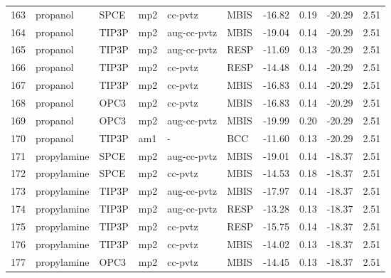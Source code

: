 \begin{tabular}{llllllrrrr}
163 &                       propanol &       SPCE &      mp2 &      cc-pvtz &         MBIS & -16.82 &      0.19 &      -20.29 &     2.51 \\
164 &                       propanol &      TIP3P &      mp2 &  aug-cc-pvtz &         MBIS & -19.04 &      0.14 &      -20.29 &     2.51 \\
165 &                       propanol &      TIP3P &      mp2 &  aug-cc-pvtz &         RESP & -11.69 &      0.13 &      -20.29 &     2.51 \\
166 &                       propanol &      TIP3P &      mp2 &      cc-pvtz &         RESP & -14.48 &      0.14 &      -20.29 &     2.51 \\
167 &                       propanol &      TIP3P &      mp2 &      cc-pvtz &         MBIS & -16.83 &      0.14 &      -20.29 &     2.51 \\
168 &                       propanol &       OPC3 &      mp2 &      cc-pvtz &         MBIS & -16.83 &      0.14 &      -20.29 &     2.51 \\
169 &                       propanol &       OPC3 &      mp2 &  aug-cc-pvtz &         MBIS & -19.99 &      0.20 &      -20.29 &     2.51 \\
170 &                       propanol &      TIP3P &      am1 &            - &          BCC & -11.60 &      0.13 &      -20.29 &     2.51 \\
171 &                    propylamine &       SPCE &      mp2 &  aug-cc-pvtz &         MBIS & -19.01 &      0.14 &      -18.37 &     2.51 \\
172 &                    propylamine &       SPCE &      mp2 &      cc-pvtz &         MBIS & -14.53 &      0.18 &      -18.37 &     2.51 \\
173 &                    propylamine &      TIP3P &      mp2 &  aug-cc-pvtz &         MBIS & -17.97 &      0.14 &      -18.37 &     2.51 \\
174 &                    propylamine &      TIP3P &      mp2 &  aug-cc-pvtz &         RESP & -13.28 &      0.13 &      -18.37 &     2.51 \\
175 &                    propylamine &      TIP3P &      mp2 &      cc-pvtz &         RESP & -15.75 &      0.14 &      -18.37 &     2.51 \\
176 &                    propylamine &      TIP3P &      mp2 &      cc-pvtz &         MBIS & -14.02 &      0.13 &      -18.37 &     2.51 \\
177 &                    propylamine &       OPC3 &      mp2 &      cc-pvtz &         MBIS & -14.45 &      0.13 &      -18.37 &     2.51 \\

\end{tabular}
